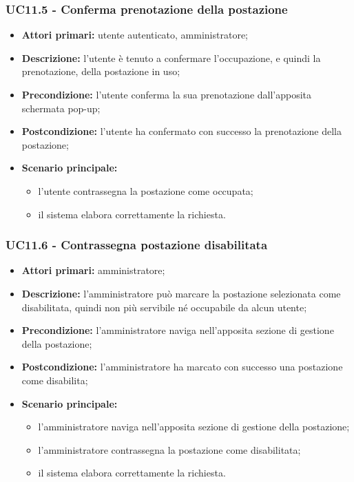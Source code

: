\subsubsection{UC11.5 - Conferma prenotazione della postazione}

\begin{itemize}
\item \textbf{Attori primari:} utente autenticato, amministratore;
\item \textbf{Descrizione:} l’utente è tenuto a confermare l’occupazione, e quindi la prenotazione, della postazione in uso;
\item \textbf{Precondizione:} l’utente conferma la sua prenotazione dall’apposita schermata pop-up; 
\item \textbf{Postcondizione:} l’utente ha confermato con successo la prenotazione della postazione;
\item \textbf{Scenario principale:} 
	\begin{itemize}
		\item l’utente contrassegna la postazione come occupata;
		\item il sistema elabora correttamente la richiesta.
	\end{itemize}
\end{itemize}

\subsubsection{UC11.6 - Contrassegna postazione disabilitata}

\begin{itemize}
\item \textbf{Attori primari:} amministratore;
\item \textbf{Descrizione:} l’amministratore può marcare la postazione selezionata come disabilitata, quindi non più servibile né occupabile da alcun utente;
\item \textbf{Precondizione:} l’amministratore naviga nell’apposita sezione di gestione della postazione;
\item \textbf{Postcondizione:} l’amministratore ha marcato con successo una postazione come disabilita;
\item \textbf{Scenario principale:} 
	\begin{itemize}
		\item l’amministratore naviga nell’apposita sezione di gestione della postazione;
		\item l’amministratore contrassegna la postazione come disabilitata;
		\item il sistema elabora correttamente la richiesta.
	\end{itemize}
\end{itemize}

